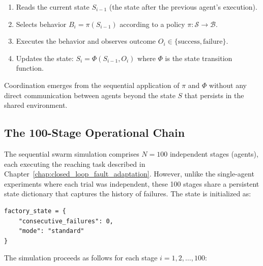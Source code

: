 \documentclass[12pt,a4paper,oneside]{report}
\begin{document}
\begin{enumerate}
    \item Reads the current state $S_{i-1}$ (the state after the previous agent's execution).
    \item Selects behavior $B_i = \pi(S_{i-1})$ according to a policy $\pi: \mathcal{S} \rightarrow \mathcal{B}$.
    \item Executes the behavior and observes outcome $O_i \in \{\text{success}, \text{failure}\}$.
    \item Updates the state: $S_i = \Phi(S_{i-1}, O_i)$ where $\Phi$ is the state transition function.
\end{enumerate}

Coordination emerges from the sequential application of $\pi$ and $\Phi$ without any direct communication between agents beyond the state $S$ that persists in the shared environment.

\subsection{The 100-Stage Operational Chain}
\label{subsec:the_100_stage_operational_chain}

The sequential swarm simulation comprises $N = 100$ independent stages (agents), each executing the reaching task described in Chapter~\ref{chap:closed_loop_fault_adaptation}. However, unlike the single-agent experiments where each trial was independent, these 100 stages share a persistent state dictionary that captures the history of failures. The state is initialized as:

\begin{verbatim}
factory_state = {
    "consecutive_failures": 0,
    "mode": "standard"
}
\end{verbatim}

The simulation proceeds as follows for each stage $i = 1, 2, \ldots, 100$:
\end{document}
